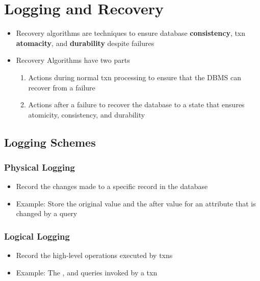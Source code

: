 \documentclass[11pt]{article}
\begin{document}
\maketitle
\thispagestyle{plain}

\section{Logging and Recovery}
\begin{itemize}
    \item Recovery algorithms are techniques to ensure database \textbf{consistency}, txn \textbf{atomacity}, and \textbf{durability} despite failures
    \item Recovery Algorithms have two parts
    \begin{enumerate}
        \item Actions during normal txn processing to ensure that the DBMS can recover from a failure
        \item Actions after a failure to recover the database to a state that ensures atomicity, consistency, and durability
    \end{enumerate}
\end{itemize}

    \subsection*{Logging Schemes}

    \subsubsection*{Physical Logging}
    \begin{itemize}
        \item Record the changes made to a specific record in the database
        \item Example: Store the original value and the after value for an attribute that is changed by a query
    \end{itemize}

    \subsubsection*{Logical Logging}
    \begin{itemize}
        \item Record the high-level operations executed by txns
        \item Example: The ,  and  queries invoked by a txn
    \end{itemize}
\end{document}
